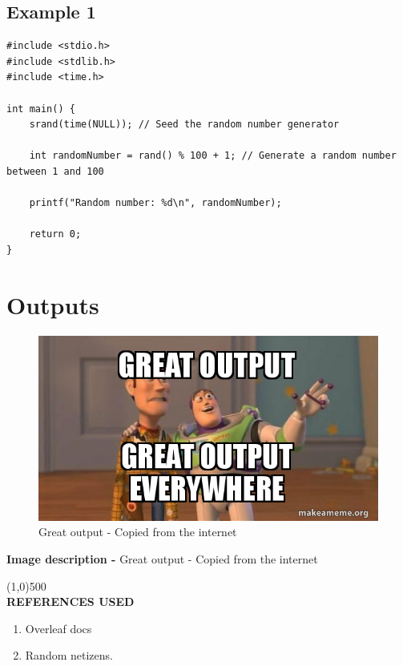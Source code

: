 \documentclass[a4paper,12pt]{article}
\begin{document}
\subsection{Example 1}

\begin{lstlisting}
#include <stdio.h>
#include <stdlib.h>
#include <time.h>

int main() {
    srand(time(NULL)); // Seed the random number generator

    int randomNumber = rand() % 100 + 1; // Generate a random number between 1 and 100

    printf("Random number: %d\n", randomNumber);

    return 0;
}

\end{lstlisting}

\section{Outputs}

\begin{figure}[H]
    \centering
    \includegraphics[width=0.8\linewidth]{great-output-great.jpg}
    \caption{Great output - Copied from the internet}
    
\end{figure}

\textbf{Image description - }Great output - Copied from the internet

\vspace{10mm}
\line(1,0){500}
\vspace{10mm}\\    
\large{\textbf{REFERENCES USED}}
 \begin{enumerate}
     \item Overleaf docs
     \item Random netizens.
 \end{enumerate}
\end{document}
